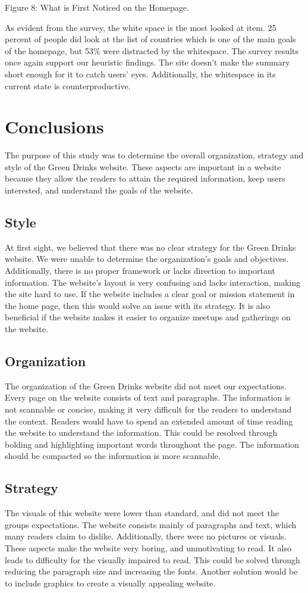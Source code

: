 \documentclass[12pt]{article}
\begin{document}
Figure 8: What is First Noticed on the Homepage.

As evident from the survey, the white space is the most looked at item. 25 percent of people did look at the list of countries which is one of the main goals of the homepage, but 53\% were distracted by the whitespace. The survey results once again support our heuristic findings. The site doesn’t make the summary short enough for it to catch users’ eyes. Additionally, the whitespace in its current state is counterproductive.

\section{Conclusions}
The purpose of this study was to determine the overall organization, strategy and style of the Green Drinks website. These aspects are important in a website because they allow the readers to attain the required information, keep users interested, and understand the goals of the website.

\subsection*{Style}
At first sight, we believed that there was no clear strategy for the Green Drinks website. We were unable to determine the organization's goals and objectives. Additionally, there is no proper framework or lacks direction to important information. The website’s layout is very confusing and lacks interaction, making the site hard to use. If the website includes a clear goal or mission statement in the home page, then this would solve an issue with its strategy. It is also beneficial if the website makes it easier to organize meetups and gatherings on the website. 
\subsection*{Organization}
The organization of the Green Drinks website did not meet our expectations. Every page on the website consists of text and paragraphs. The information is not scannable or concise, making it very difficult for the readers to understand the context. Readers would have to spend an extended amount of time reading the website to understand the information. This could be resolved through bolding and highlighting important words throughout the page. The information should be compacted so the information is more scannable. 
\subsection*{Strategy}
The visuals of this website were lower than standard, and did not meet the groups expectations. The website consists mainly of paragraphs and text, which many readers claim to dislike. Additionally, there were no pictures or visuals. These aspects make the website very boring, and unmotivating to read. It also leads to difficulty for the visually impaired to read. This could be solved through reducing the paragraph size and increasing the fonts. Another solution would be to include graphics to create a visually appealing website.
\end{document}
